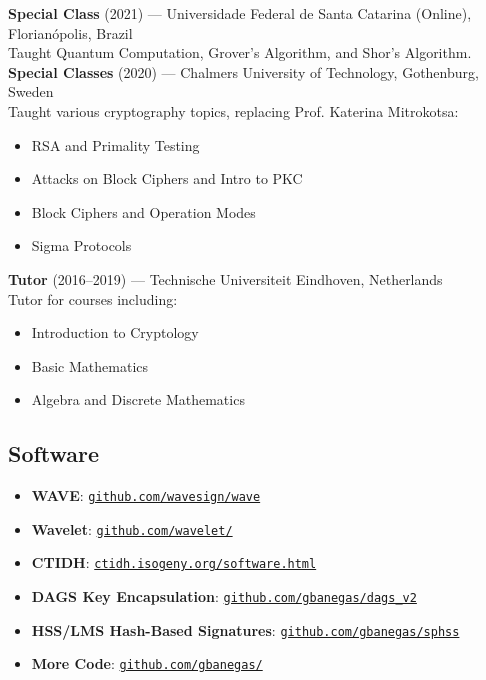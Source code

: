 \noindent
\textbf{Special Class} (2021) — Universidade Federal de Santa Catarina (Online), Florianópolis, Brazil~\\
Taught Quantum Computation, Grover's Algorithm, and Shor's Algorithm. ~\\

\noindent
\textbf{Special Classes} (2020) — Chalmers University of Technology, Gothenburg, Sweden~\\ 
Taught various cryptography topics, replacing Prof. Katerina Mitrokotsa:  
\begin{itemize}
\item RSA and Primality Testing  
\item Attacks on Block Ciphers and Intro to PKC  
\item Block Ciphers and Operation Modes  
\item Sigma Protocols  
\end{itemize}

\noindent
\textbf{Tutor} (2016--2019) — Technische Universiteit Eindhoven, Netherlands ~\\ 
Tutor for courses including:  
\begin{itemize}
\item Introduction to Cryptology  
\item Basic Mathematics  
\item Algebra and Discrete Mathematics  
\end{itemize}


\subsection*{Software}

\small
\begin{itemize}
\setlength{\itemsep}{1pt}
    \item \textbf{WAVE}: \href{https://github.com/wavesign/wave}{\texttt{github.com/wavesign/wave}}
    \item \textbf{Wavelet}: \href{https://github.com/wavelet/}{\texttt{github.com/wavelet/}}
    \item \textbf{CTIDH}: \href{http://ctidh.isogeny.org/software.html}{\texttt{ctidh.isogeny.org/software.html}}
    \item \textbf{DAGS Key Encapsulation}: \href{https://github.com/gbanegas/dags_v2}{\texttt{github.com/gbanegas/dags\_v2}}
    \item \textbf{HSS/LMS Hash-Based Signatures}: \href{https://github.com/gbanegas/sphss}{\texttt{github.com/gbanegas/sphss}}
    \item \textbf{More Code}: \href{https://github.com/gbanegas/}{\texttt{github.com/gbanegas/}}
\end{itemize}


